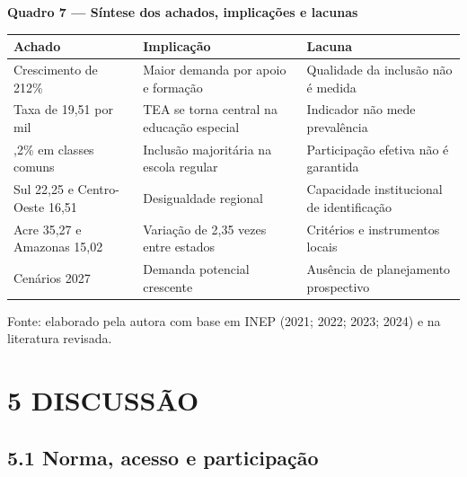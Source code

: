 \textbf{Quadro 7 --- Síntese dos achados, implicações e lacunas}

\begingroup\small

\begin{longtable}[]{@{}
  >{\raggedright\arraybackslash}p{}
  >{\raggedright\arraybackslash}p{}
  >{\raggedright\arraybackslash}p{}@{}}
\toprule\noalign{}
\begin{minipage}[b]{\linewidth}\raggedright
Achado
\end{minipage} & \begin{minipage}[b]{\linewidth}\raggedright
Implicação
\end{minipage} & \begin{minipage}[b]{\linewidth}\raggedright
Lacuna
\end{minipage} \\
\midrule\noalign{}
\endhead
\bottomrule\noalign{}
\endlastfoot
Crescimento de 212\% & Maior demanda por apoio e formação & Qualidade da
inclusão não é medida \\
Taxa de 19,51 por mil & TEA se torna central na educação especial &
Indicador não mede prevalência \\
96,2\% em classes comuns & Inclusão majoritária na escola regular &
Participação efetiva não é garantida \\
Sul 22,25 e Centro-Oeste 16,51 & Desigualdade regional & Capacidade
institucional de identificação \\
Acre 35,27 e Amazonas 15,02 & Variação de 2,35 vezes entre estados &
Critérios e instrumentos locais \\
Cenários 2027 & Demanda potencial crescente & Ausência de planejamento
prospectivo \\
\end{longtable}

\endgroup

Fonte: elaborado pela autora com base em INEP (2021; 2022; 2023; 2024) e
na literatura revisada.

\section{5 DISCUSSÃO}\label{discussuxe3o}

\subsection{5.1 Norma, acesso e
participação}\label{norma-acesso-e-participauxe7uxe3o}

